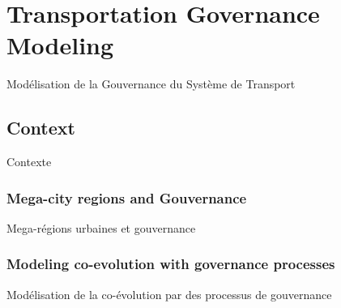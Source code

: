 




\section{Transportation Governance Modeling}{Modélisation de la Gouvernance du Système de Transport} 


\label{sec:lutecia}








\subsection{Context}{Contexte}


\subsubsection{Mega-city regions and Gouvernance}{Mega-régions urbaines et gouvernance}





\subsubsection{Modeling co-evolution with governance processes}{Modélisation de la co-évolution par des processus de gouvernance}


